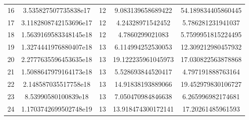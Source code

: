 \documentclass[10pt]{article}
\begin{document}
\begin{center}
\begin{tabular}{|c| c c c c|}
        16 & 3.535827507735838e17 & 12 & 9.083139658689422 & 54.189834405860445\\
        17 & 3.1182808742153696e17 & 12 & 4.24328971542452 & 5.786281231941037\\
        18 & 1.5639169583348145e18 & 12 & 4.7860299021083 & 5.7599951815224495\\
        19 & 1.3274441976880407e18 & 13 & 6.114994252530053 & 12.309212980457932\\
        20 & 2.2777635596453635e18 & 13 & 19.122235961045973 & 17.030822563878868\\
        21 & 1.5088647979164173e18 & 13 & 5.528693844520417 & 4.797191888763164\\
        22 & 2.148587035517758e18 & 13 & 14.91838193889066 & 19.452979830106727\\
        23 & 8.53990580100839e18 & 13 & 7.050470984846638 & 6.265996982174681\\
        24 & 1.1703742699502748e19 & 13 & 13.918474300172141 & 17.20261485961593\\
\hline
    \end{tabular}
\end{center}
\end{document}
